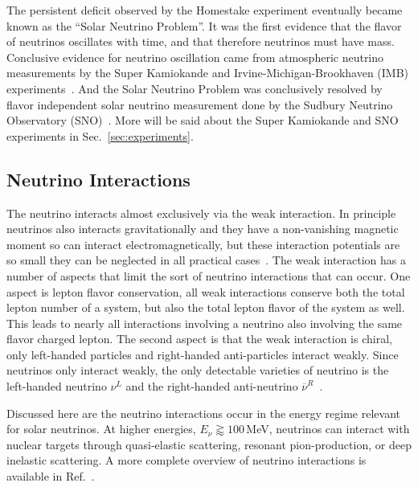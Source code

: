 The persistent deficit observed by the Homestake experiment
eventually became known as the ``Solar Neutrino Problem''.
It was the first evidence that the flavor of neutrinos oscillates with
time, and that therefore neutrinos must have mass.
Conclusive evidence for neutrino oscillation came from  atmospheric neutrino
measurements by the Super Kamiokande and Irvine-Michigan-Brookhaven (IMB)
experiments~\citep{superk_atmospherics, imb_atmospherics}.
And the Solar Neutrino Problem was conclusively resolved by flavor
independent solar neutrino measurement done
by the Sudbury Neutrino Observatory (SNO)~\citep{sno_first, sno_second, solar_nu_problem}.
More will be said about the Super Kamiokande and SNO experiments in
Sec.~\ref{sec:experiments}.

\subsection{Neutrino Interactions}
\label{sec:neutrino_interactions}
The neutrino interacts almost exclusively via the weak interaction.
In principle neutrinos also interacts gravitationally and they have a non-vanishing
magnetic moment so can interact electromagnetically, but these
interaction potentials are so small they can be neglected in all practical
cases~\citep{neutrino_magmom}.
The weak interaction has a number of aspects that limit the sort of neutrino
interactions that can occur. One aspect is lepton flavor conservation,
all weak interactions conserve both the total lepton number of a system, but also
the total lepton flavor of the system as well.
This leads to nearly all interactions involving a neutrino also involving the
same flavor charged lepton.
The second aspect is that the weak interaction is chiral,
only left-handed particles and right-handed anti-particles interact weakly.
Since neutrinos only interact weakly, the only detectable varieties of neutrino
is the left-handed neutrino $\nu^{L}$  and the right-handed
anti-neutrino $\overline{\nu}^{R}$~\citep{weinberg}.

Discussed here are the neutrino interactions occur in the energy regime
relevant for solar neutrinos.
At higher energies, $E_{\nu} \gtrapprox 100$\,MeV, neutrinos can interact
with nuclear targets through quasi-elastic scattering, resonant
pion-production, or deep inelastic scattering.
A more complete overview of neutrino interactions is available in Ref.~\citep{neutrino_xsec}.

